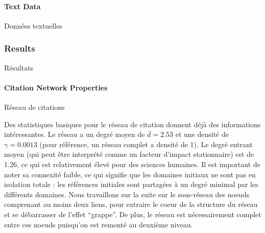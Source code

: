 \paragraph{Text Data}{Données textuelles}




\subsubsection{Results}{Résultats}




\paragraph{Citation Network Properties}{Réseau de citations}


Des statistiques basiques pour le réseau de citation donnent déjà des informations intéressantes. Le réseau a un degré moyen de $\bar{d}=2.53$ et une densité de $\gamma=0.0013$ (pour référence, un réseau complet a densité de 1). Le degré entrant moyen (qui peut être interprété comme un facteur d'impact stationnaire) est de 1.26, ce qui est relativement élevé pour des sciences humaines. Il est important de noter sa connexité faible, ce qui signifie que les domaines initiaux ne sont pas en isolation totale : les références initiales sont partagées à un degré minimal par les différents domaines. Nous travaillons sur la suite sur le sous-réseau des noeuds comprenant au moins deux liens, pour extraire le coeur de la structure du réseau et se débarrasser de l'effet ``grappe''. De plus, le réseau est nécessairement complet entre ces noeuds puisqu'on est remonté au deuxième niveau.


